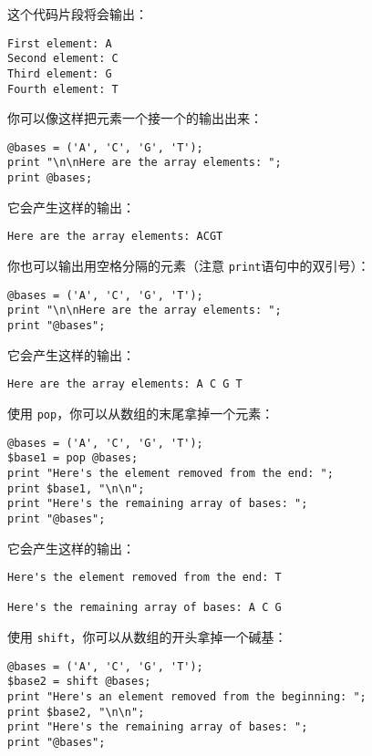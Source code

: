 这个代码片段将会输出：

\begin{lstlisting}
First element: A
Second element: C
Third element: G
Fourth element: T
\end{lstlisting}

你可以像这样把元素一个接一个的输出出来：

\begin{lstlisting}
@bases = ('A', 'C', 'G', 'T');
print "\n\nHere are the array elements: ";
print @bases;
\end{lstlisting}

它会产生这样的输出：

\begin{lstlisting}
Here are the array elements: ACGT
\end{lstlisting}

你也可以输出用空格分隔的元素（注意  \verb|print|语句中的双引号）：

\begin{lstlisting}
@bases = ('A', 'C', 'G', 'T');
print "\n\nHere are the array elements: ";
print "@bases";
\end{lstlisting}

它会产生这样的输出：

\begin{lstlisting}
Here are the array elements: A C G T
\end{lstlisting}

使用 \verb|pop|，你可以从数组的末尾拿掉一个元素：

\begin{lstlisting}
@bases = ('A', 'C', 'G', 'T');
$base1 = pop @bases;
print "Here's the element removed from the end: ";
print $base1, "\n\n";
print "Here's the remaining array of bases: ";
print "@bases";
\end{lstlisting}

它会产生这样的输出：

\begin{lstlisting}
Here's the element removed from the end: T

Here's the remaining array of bases: A C G
\end{lstlisting}

使用 \verb|shift|，你可以从数组的开头拿掉一个碱基：

\begin{lstlisting}
@bases = ('A', 'C', 'G', 'T');
$base2 = shift @bases;
print "Here's an element removed from the beginning: ";
print $base2, "\n\n";
print "Here's the remaining array of bases: ";
print "@bases";
\end{lstlisting}

